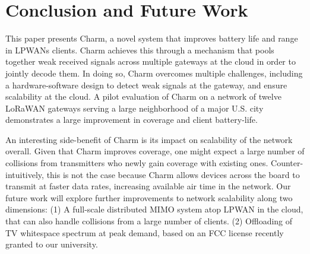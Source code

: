 \section{Conclusion and Future Work}
\label{sec:conclusion}

This paper presents Charm, a novel system that improves battery life and range
in LPWANs clients. Charm achieves this through a mechanism that pools
together weak received signals across multiple gateways at the cloud in order
to jointly decode them. In doing so, Charm overcomes multiple challenges,
including a hardware-software design to detect weak signals at the gateway,
and ensure scalability at the cloud. A pilot evaluation of Charm on a network
of twelve LoRaWAN gateways serving a large neighborhood of a major U.S. city
demonstrates a large improvement in coverage and client battery-life.

An interesting side-benefit of Charm is its impact on scalability of the
network overall. Given that Charm improves coverage, one might expect a large
number of collisions from transmitters who newly gain coverage with existing
ones. Counter-intuitively, this is not the case because Charm allows devices
across the board to transmit at faster data rates, increasing available air
time in the network. Our future work will explore further improvements to
network scalability along two dimensions: (1) A full-scale distributed MIMO
system atop LPWAN in the cloud, that can also handle collisions from a large
number of clients. (2) Offloading of TV whitespace spectrum at peak demand,
based on an FCC license recently granted to our university.



